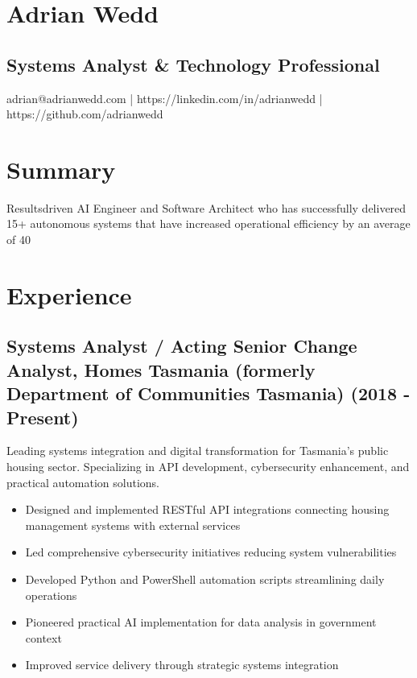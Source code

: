 \documentclass{article}
\begin{document}
\section*{Adrian Wedd}
\subsection*{Systems Analyst & Technology Professional}
adrian@adrianwedd.com | https://linkedin.com/in/adrianwedd | https://github.com/adrianwedd

\section*{Summary}
Resultsdriven AI Engineer and Software Architect who has successfully delivered 15+ autonomous systems that have increased operational efficiency by an average of 40%

\section*{Experience}
\subsection*{Systems Analyst / Acting Senior Change Analyst, Homes Tasmania (formerly Department of Communities Tasmania) (2018 - Present)}
Leading systems integration and digital transformation for Tasmania's public housing sector. Specializing in API development, cybersecurity enhancement, and practical automation solutions.
\begin{itemize}
    \item Designed and implemented RESTful API integrations connecting housing management systems with external services
    \item Led comprehensive cybersecurity initiatives reducing system vulnerabilities
    \item Developed Python and PowerShell automation scripts streamlining daily operations
    \item Pioneered practical AI implementation for data analysis in government context
    \item Improved service delivery through strategic systems integration
\end{itemize}
\end{document}
